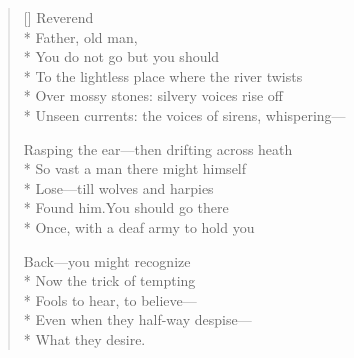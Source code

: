 \label{ch:lear_al}
\settowidth{\versewidth}{Unseen currents: the voices of sirens, whispering---}
\begin{verse}[\versewidth]
 \qquad \qquad Reverend\\*
Father, old man,\\*
You do not go but you should\\*
To the lightless place where the river twists\\*
Over mossy stones: silvery voices rise off\\*
Unseen currents: the voices of sirens, whispering---

Rasping the ear---then drifting across heath\\*
So vast a man there might himself\\*
Lose---till wolves and harpies\\*
Found him.\qquad You should go there\\*
Once, with a deaf army to hold you

Back---you might recognize\\*
Now the trick of tempting\\*
Fools to hear, to believe---\\*
Even when they half-way despise---\\*
What they desire.
\end{verse}
